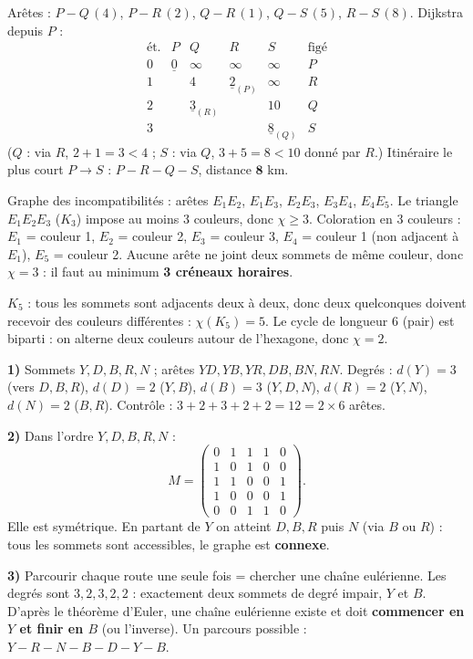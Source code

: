 Arêtes : $P\!-\!Q\,(4)$, $P\!-\!R\,(2)$, $Q\!-\!R\,(1)$, $Q\!-\!S\,(5)$, $R\!-\!S\,(8)$.
Dijkstra depuis $P$ :
\[
\begin{array}{c|cccc|l}
\text{ét.} & P & Q & R & S & \text{figé}\\\hline
0 & \underline{0} & \infty & \infty & \infty & P\\
1 & & 4 & \underline{2}_{(P)} & \infty & R\\
2 & & \underline{3}_{(R)} & & 10 & Q\\
3 & & & & \underline{8}_{(Q)} & S
\end{array}
\]
($Q$ : via $R$, $2+1=3<4$ ; $S$ : via $Q$, $3+5=8<10$ donné par $R$.) Itinéraire le plus
court $P\to S$ : $P-R-Q-S$, distance $\mathbf{8}$ km.

Graphe des incompatibilités : arêtes $E_1E_2$, $E_1E_3$, $E_2E_3$, $E_3E_4$, $E_4E_5$.
Le triangle $E_1E_2E_3$ ($K_3$) impose au moins $3$ couleurs, donc $\chi\ge 3$. Coloration en
$3$ couleurs : $E_1$ = couleur 1, $E_2$ = couleur 2, $E_3$ = couleur 3, $E_4$ = couleur 1
(non adjacent à $E_1$), $E_5$ = couleur 2. Aucune arête ne joint deux sommets de même
couleur, donc $\chi=3$ : il faut au minimum \textbf{3 créneaux horaires}.

$K_5$ : tous les sommets sont adjacents deux à deux, donc deux quelconques doivent recevoir
des couleurs différentes : $\chi(K_5)=5$. Le cycle de longueur $6$ (pair) est biparti : on
alterne deux couleurs autour de l'hexagone, donc $\chi=2$.

\textbf{1)} Sommets $Y,D,B,R,N$ ; arêtes $YD,YB,YR,DB,BN,RN$. Degrés :
$d(Y)=3$ (vers $D,B,R$), $d(D)=2$ ($Y,B$), $d(B)=3$ ($Y,D,N$), $d(R)=2$ ($Y,N$),
$d(N)=2$ ($B,R$). Contrôle : $3+2+3+2+2=12=2\times 6$ arêtes.

\smallskip
\textbf{2)} Dans l'ordre $Y,D,B,R,N$ :
\[
M=\begin{pmatrix}
0&1&1&1&0\\
1&0&1&0&0\\
1&1&0&0&1\\
1&0&0&0&1\\
0&0&1&1&0
\end{pmatrix}.
\]
Elle est symétrique. En partant de $Y$ on atteint $D,B,R$ puis $N$ (via $B$ ou $R$) : tous
les sommets sont accessibles, le graphe est \textbf{connexe}.

\smallskip
\textbf{3)} Parcourir chaque route une seule fois = chercher une chaîne eulérienne. Les
degrés sont $3,2,3,2,2$ : exactement deux sommets de degré impair, $Y$ et $B$. D'après le
théorème d'Euler, une chaîne eulérienne existe et doit \textbf{commencer en $Y$ et finir en
$B$} (ou l'inverse). Un parcours possible : $Y\!-\!R\!-\!N\!-\!B\!-\!D\!-\!Y\!-\!B$.


